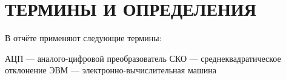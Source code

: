 \section*{ТЕРМИНЫ И ОПРЕДЕЛЕНИЯ}

В отчёте применяют следующие термины:

АЦП — аналого-цифровой преобразователь
СКО — среднеквадратическое отклонение
ЭВМ — электронно-вычислительная машина

